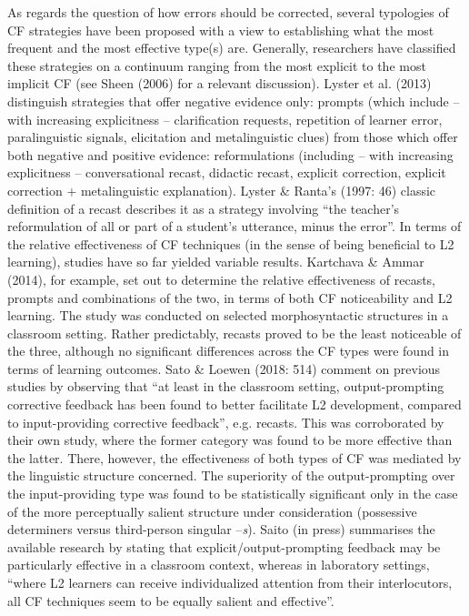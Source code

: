 \documentclass[12pt]{article}
\newenvironment{styleStandard}{\setlength\leftskip{0cm}\setlength\rightskip{0cm plus 1fil}\setlength\parindent{0cm}\setlength\parfillskip{0pt plus 1fil}\setlength\parskip{0cm plus 1pt}\writerlistparindent\writerlistleftskip\leavevmode\normalfont\normalsize\writerlistlabel\ignorespaces}{\unskip\vspace{0cm plus 1pt}\par}
\newcommand\writerlistleftskip{}
\newcommand\writerlistparindent{}
\newcommand\writerlistlabel{}
\begin{document}
\begin{styleStandard}
As regards the question of how errors should be corrected, several typologies of CF strategies have been proposed with a view to establishing what the most frequent and the most effective type(s) are. Generally, researchers have classified these strategies on a continuum ranging from the most explicit to the most implicit CF (see Sheen (2006) for a relevant discussion). Lyster et al. (2013) distinguish strategies that offer negative evidence only: prompts (which include – with increasing explicitness – clarification requests, repetition of learner error, paralinguistic signals, elicitation and metalinguistic clues) from those which offer both negative and positive evidence: reformulations (including – with increasing explicitness – conversational recast, didactic recast, explicit correction, explicit correction + metalinguistic explanation). Lyster \& Ranta’s (1997: 46) classic definition of a recast describes it as a strategy involving “the teacher’s reformulation of all or part of a student’s utterance, minus the error”. In terms of the relative effectiveness of CF techniques (in the sense of being beneficial to L2 learning), studies have so far yielded variable results. Kartchava \& Ammar (2014), for example, set out to determine the relative effectiveness of recasts, prompts and combinations of the two, in terms of both CF noticeability and L2 learning. The study was conducted on selected morphosyntactic structures in a classroom setting. Rather predictably, recasts proved to be the least noticeable of the three, although no significant differences across the CF types were found in terms of learning outcomes. Sato \& Loewen (2018: 514) comment on previous studies by observing that “at least in the classroom setting, output-prompting corrective feedback has been found to better facilitate L2 development, compared to input-providing corrective feedback”, e.g. recasts. This was corroborated by their own study, where the former category was found to be more effective than the latter. There, however, the effectiveness of both types of CF was mediated by the linguistic structure concerned. The superiority of the output-prompting over the input-providing type was found to be statistically significant only in the case of the more perceptually salient structure under consideration (possessive determiners versus third-person singular –\textit{s}). Saito (in press) summarises the available research by stating that explicit/output-prompting feedback may be particularly effective in a classroom context, whereas in laboratory settings, “where L2 learners can receive individualized attention from their interlocutors, all CF techniques seem to be equally salient and effective”.
\end{styleStandard}
\end{document}
